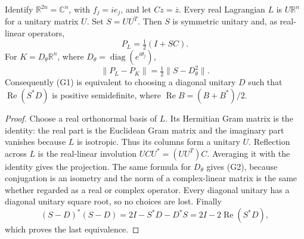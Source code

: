 \begin{lemma}\ours
Identify \(\mathbb R^{2n}=\mathbb C^n\), with \(f_j=i e_j\), and let
\(Cz=\overline z\). Every real Lagrangian \(L\) is \(U\mathbb R^n\)
for a unitary matrix \(U\). Set \(S=UU^T\). Then \(S\) is symmetric
unitary and, as real-linear operators,
\[
 P_L=\tfrac12(I+SC).
\]
For \(K=D_\theta\mathbb R^n\), where
\(D_\theta=\operatorname{diag}(e^{i\theta_j})\),
\[
 \|P_L-P_K\|=\tfrac12\|S-D_\theta^2\|. \tag{G2}
\]
Consequently (G1) is equivalent to choosing a diagonal unitary \(D\)
such that \(\operatorname{Re}(S^*D)\) is positive semidefinite, where
\(\operatorname{Re}B=(B+B^*)/2\).
\end{lemma}
\begin{proof}
Choose a real orthonormal basis of \(L\). Its Hermitian Gram matrix is
the identity: the real part is the Euclidean Gram matrix and the imaginary
part vanishes because \(L\) is isotropic. Thus its columns form a unitary
\(U\). Reflection across \(L\) is the real-linear involution
\(UCU^*=(UU^T)C\). Averaging it with the identity gives the projection.
The same formula for \(D_\theta\) gives (G2), because conjugation is an
isometry and the norm of a complex-linear matrix is the same whether
regarded as a real or complex operator. Every diagonal unitary has a
diagonal unitary square root, so no choices are lost. Finally
\[
 (S-D)^*(S-D)=2I-S^*D-D^*S
             =2I-2\operatorname{Re}(S^*D),
\]
which proves the last equivalence.
\end{proof}

